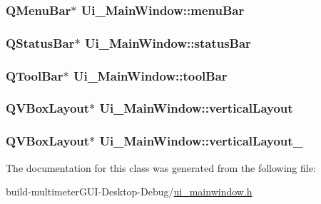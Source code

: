 \hypertarget{class_ui___main_window_a2be1c24ec9adfca18e1dcc951931457f}{
\subsubsection[{menu\-Bar}]{\setlength{\rightskip}{0pt plus 5cm}Q\-Menu\-Bar$\ast$ Ui\-\_\-\-Main\-Window\-::menu\-Bar}}\label{class_ui___main_window_a2be1c24ec9adfca18e1dcc951931457f}
\hypertarget{class_ui___main_window_a50fa481337604bcc8bf68de18ab16ecd}{
\subsubsection[{status\-Bar}]{\setlength{\rightskip}{0pt plus 5cm}Q\-Status\-Bar$\ast$ Ui\-\_\-\-Main\-Window\-::status\-Bar}}\label{class_ui___main_window_a50fa481337604bcc8bf68de18ab16ecd}
\hypertarget{class_ui___main_window_ab84dc49349f514d7b7d3fe8e78de069b}{
\subsubsection[{tool\-Bar}]{\setlength{\rightskip}{0pt plus 5cm}Q\-Tool\-Bar$\ast$ Ui\-\_\-\-Main\-Window\-::tool\-Bar}}\label{class_ui___main_window_ab84dc49349f514d7b7d3fe8e78de069b}
\hypertarget{class_ui___main_window_aecd96a04789fcfec3f98d80390ad8184}{
\subsubsection[{vertical\-Layout}]{\setlength{\rightskip}{0pt plus 5cm}Q\-V\-Box\-Layout$\ast$ Ui\-\_\-\-Main\-Window\-::vertical\-Layout}}\label{class_ui___main_window_aecd96a04789fcfec3f98d80390ad8184}
\hypertarget{class_ui___main_window_a0c01bad60d9f422a1258e710635a2f65}{
\subsubsection[{vertical\-Layout\-\_\-2}]{\setlength{\rightskip}{0pt plus 5cm}Q\-V\-Box\-Layout$\ast$ Ui\-\_\-\-Main\-Window\-::vertical\-Layout\-\_}}\label{class_ui___main_window_a0c01bad60d9f422a1258e710635a2f65}


The documentation for this class was generated from the following file\-:\begin{DoxyCompactItemize}
\item 
build-\/multimeter\-G\-U\-I-\/\-Desktop-\/\-Debug/\hyperlink{ui__mainwindow_8h}{ui\-\_\-mainwindow.\-h}\end{DoxyCompactItemize}

